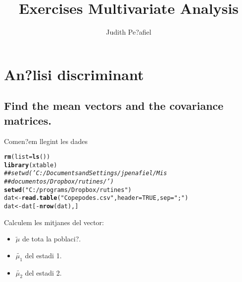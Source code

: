 \documentclass[a4paper,titlepage,12pt]{article}\usepackage[]{graphicx}\usepackage[]{color}
\makeatletter
\newcommand{\hlnum}[1]{\textcolor[rgb]{0.686,0.059,0.569}{#1}}%
\newcommand{\hlstr}[1]{\textcolor[rgb]{0.192,0.494,0.8}{#1}}%
\newcommand{\hlcom}[1]{\textcolor[rgb]{0.678,0.584,0.686}{\textit{#1}}}%
\newcommand{\hlopt}[1]{\textcolor[rgb]{0,0,0}{#1}}%
\newcommand{\hlstd}[1]{\textcolor[rgb]{0.345,0.345,0.345}{#1}}%
\newcommand{\hlkwb}[1]{\textcolor[rgb]{0.69,0.353,0.396}{#1}}%
\newcommand{\hlkwc}[1]{\textcolor[rgb]{0.333,0.667,0.333}{#1}}%
\newcommand{\hlkwd}[1]{\textcolor[rgb]{0.737,0.353,0.396}{\textbf{#1}}}%
\newenvironment{kframe}{%
 \def\at@end@of@kframe{}%
 \ifinner\ifhmode%
  \def\at@end@of@kframe{\end{minipage}}%
  \begin{minipage}{\columnwidth}%
 \fi\fi%
 \def\FrameCommand##1{\hskip\@totalleftmargin \hskip-\fboxsep
 \colorbox{shadecolor}{##1}\hskip-\fboxsep
     \hskip-\linewidth \hskip-\@totalleftmargin \hskip\columnwidth}%
 \MakeFramed {\advance\hsize-\width
   \@totalleftmargin\z@ \linewidth\hsize
   \@setminipage}}%
 {\par\unskip\endMakeFramed%
 \at@end@of@kframe}
\newenvironment{knitrout}{}{} %
\makeatother
\begin{document}
\renewcommand{\tablename}{Tabla}
\renewcommand{\listtablename}{\'{I}ndice de tablas} 
\renewcommand{\listfigurename}{\'{I}ndice de figuras}


\title{\bf Exercises Multivariate Analysis}

\vspace{1cm}

\author{Judith Pe?afiel}


\maketitle
\newpage


\section{An?lisi discriminant}
\subsection{Find the mean vectors and the covariance matrices.}
Comen?em llegint les dades
\begin{knitrout}
\color{fgcolor}\begin{kframe}
\begin{alltt}
\hlkwd{rm}\hlstd{(}\hlkwc{list} \hlstd{=} \hlkwd{ls}\hlstd{())}
\hlkwd{library}\hlstd{(xtable)}
\hlcom{## setwd('C:/Documents and Settings/jpenafiel/Mis}
\hlcom{## documentos/Dropbox/rutines/')}
\hlkwd{setwd}\hlstd{(}\hlstr{"C:/programs/Dropbox/rutines"}\hlstd{)}
\hlstd{dat} \hlkwb{<-} \hlkwd{read.table}\hlstd{(}\hlstr{"Copepodes.csv"}\hlstd{,} \hlkwc{header} \hlstd{=} \hlnum{TRUE}\hlstd{,} \hlkwc{sep} \hlstd{=} \hlstr{";"}\hlstd{)}
\hlstd{dat} \hlkwb{<-} \hlstd{dat[}\hlopt{-}\hlkwd{nrow}\hlstd{(dat), ]}
\end{alltt}
\end{kframe}
\end{knitrout}

Calculem les mitjanes del vector: 
\begin{itemize}
\item $\tilde{\mu}$ de tota la poblaci?.
\item $\tilde{\mu_{1}}$   del estadi 1.
\item $\tilde{\mu_{2}}$  del estadi 2.
\end{itemize}
\end{document}
